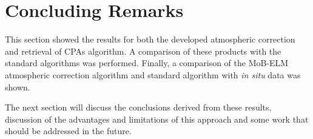 \section{Concluding Remarks}

This section showed the results for both the developed atmospheric correction and retrieval of CPAs algorithm. A comparison of these products with the standard algorithms was performed. Finally, a comparison of the MoB-ELM atmospheric correction algorithm and standard algorithm with {\it in situ} data was shown. 

The next section will discuss the conclusions derived from these results, discussion of the advantages and limitations of this approach and some work that should be addressed in the future.